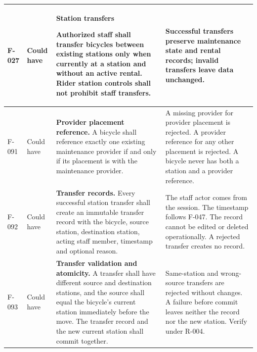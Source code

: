 \documentclass[10pt,a4paper,landscape]{article}
\newcommand{\reqtitle}[1]{{\fontsize{11}{13}\selectfont\bfseries #1}\par\nobreak\vspace{2pt}\noindent}
\begin{document}
\begin{longtable}{|C{27mm}|C{25mm}|L{79mm}|L{111mm}|}
\textbf{F-027} & Could have & \reqtitle{Station transfers}Authorized staff shall transfer bicycles between existing stations only when currently at a station and without an active rental. Rider station controls shall not prohibit staff transfers. & Successful transfers preserve maintenance state and rental records; invalid transfers leave data unchanged. \\\hline

F-091 & Could have & \textbf{Provider placement reference.} A bicycle shall reference exactly one existing maintenance provider if and only if its placement is with the maintenance provider. & A missing provider for provider placement is rejected. A provider reference for any other placement is rejected. A bicycle never has both a station and a provider reference. \\ \hline
F-092 & Could have & \textbf{Transfer records.} Every successful station transfer shall create an immutable transfer record with the bicycle, source station, destination station, acting staff member, timestamp and optional reason. & The staff actor comes from the session. The timestamp follows F-047. The record cannot be edited or deleted operationally. A rejected transfer creates no record. \\ \hline
F-093 & Could have & \textbf{Transfer validation and atomicity.} A transfer shall have different source and destination stations, and the source shall equal the bicycle's current station immediately before the move. The transfer record and the new current station shall commit together. & Same-station and wrong-source transfers are rejected without changes. A failure before commit leaves neither the record nor the new station. Verify under R-004. \\ \hline
\end{longtable}
\endgroup

\end{document}
